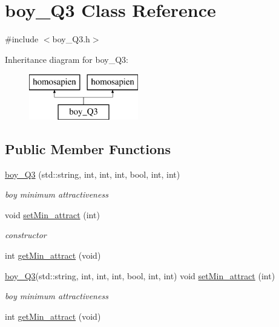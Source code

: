 \hypertarget{classboy___q3}{}\section{boy\+\_\+\+Q3 Class Reference}
\label{classboy___q3}


{\ttfamily \#include $<$boy\+\_\+\+Q3.\+h$>$}

Inheritance diagram for boy\+\_\+\+Q3\+:\begin{figure}[H]
\begin{center}
\leavevmode
\includegraphics[height=2.000000cm]{classboy___q3}
\end{center}
\end{figure}
\subsection*{Public Member Functions}
\begin{DoxyCompactItemize}
\item 
\hyperlink{classboy___q3_a18bbddd5a186cc05ec12d7e9213924b4}{boy\+\_\+\+Q3} (std\+::string, int, int, int, bool, int, int)
\begin{DoxyCompactList}\small\item\em boy minimum attractiveness \end{DoxyCompactList}\item 
void \hyperlink{classboy___q3_a7f642a510e5cd0878a7851b2b08ecdaf}{set\+Min\+\_\+attract} (int)
\begin{DoxyCompactList}\small\item\em constructor \end{DoxyCompactList}\item 
int \hyperlink{classboy___q3_adf326922fe56a18158161d0d41ebfe6d}{get\+Min\+\_\+attract} (void)
\item 
\hyperlink{classboy___q3}{boy\+\_\+\+Q3}(std\+::string, int, int, int, bool, int, int) void \hyperlink{classboy___q3_aeed82f5c07060bc8292dd4f119b70e00}{set\+Min\+\_\+attract} (int)
\begin{DoxyCompactList}\small\item\em boy minimum attractiveness \end{DoxyCompactList}\item 
int \hyperlink{classboy___q3_adf326922fe56a18158161d0d41ebfe6d}{get\+Min\+\_\+attract} (void)
\end{DoxyCompactItemize}
